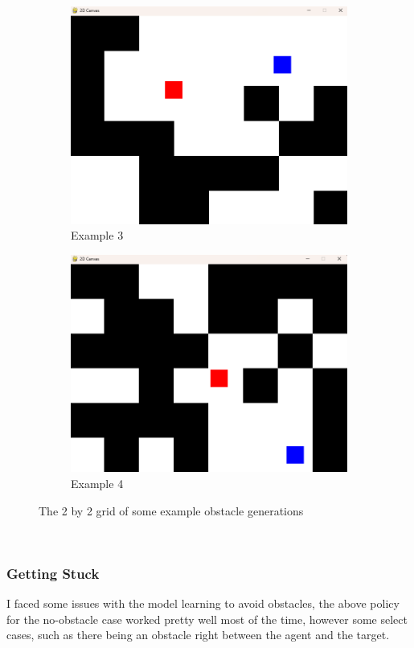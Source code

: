 \begin{figure}[htbp]
  \begin{subfigure}{0.45\textwidth}
      \centering
      \includegraphics[width=0.8\linewidth]{assets/early-work/obs-gen3.png}
      \caption{Example 3}
  \end{subfigure}%
  \hfill
  \begin{subfigure}{0.45\textwidth}
      \centering
      \includegraphics[width=0.8\linewidth]{assets/early-work/obs-gen4.png}
      \caption{Example 4}
  \end{subfigure}
  \caption{The 2 by 2 grid of some example obstacle generations}\label{fig:obs-gen}
\end{figure}\

\subsubsection{Getting Stuck}
I faced some issues with the model learning to avoid obstacles, the above policy for the no-obstacle case worked pretty well most of the time, however some select cases, such as there being an obstacle right between the agent and the target. 

